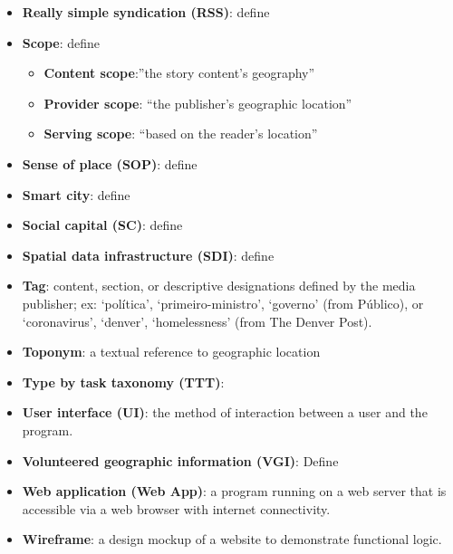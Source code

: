 \begin{itemize}
	\item[] \textbf{Really simple syndication (RSS)}:{\color{red} define}
	\item[] \textbf{Scope}: {\color{red}define}
	\begin{itemize}
		\item[] \textbf{Content scope}:{''the story content's geography''\cite{Teitler2008}}
		\item[] \textbf{Provider scope}: {``the publisher's geographic location''\cite{Teitler2008}}
		\item[] \textbf{Serving scope}: {``based on the reader's location''\cite{Teitler2008}}
	\end{itemize}
	\item[] \textbf{Sense of place (SOP)}: {\color{red} define}
	\item[] \textbf{Smart city}: {\color{red} define}
	\item[] \textbf{Social capital (SC)}: {\color{red} define} \cite{Acedo2019}
	\item[] \textbf{Spatial data infrastructure (SDI)}: {\color{red} define} \cite{Roche2012}
	\item[] \textbf{Tag}: content, section, or descriptive designations defined by the media publisher; ex: ‘política’, ‘primeiro-ministro’, ‘governo’ (from Público), or ‘coronavirus’, ‘denver’, ‘homelessness’ (from The Denver Post).
	\item[] \textbf{Toponym}: {a textual reference to geographic location \cite{Lieberman2010}}
	\item[] \textbf{Type by task taxonomy (TTT)}: {\cite{Shneiderman1996}}
	\item[] \textbf{User interface (UI)}: the method of interaction between a user and the program.
	\item[] \textbf{Volunteered geographic information (VGI)}: {\color{red} Define} \cite{Roche2012}
	\item[] \textbf{Web application (Web App)}: a program running on a web server that is accessible via a web browser with internet connectivity.
	\item[] \textbf{Wireframe}: a design mockup of a website to demonstrate functional logic.
\end{itemize}

\newpage
